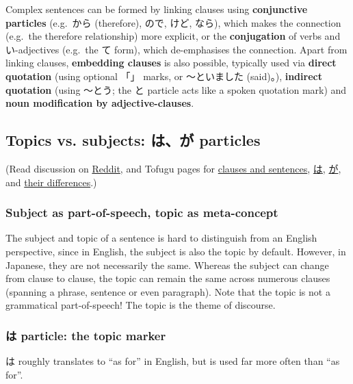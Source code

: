 \documentclass[../nihongo-gakushuu-kyouzai.tex]{subfiles}
\begin{document}
Complex sentences can be formed by linking clauses using \textbf{conjunctive particles} (e.g.\ から (therefore), ので, けど, なら), which makes the connection (e.g.\ the therefore relationship) more explicit, or the \textbf{conjugation} of verbs and い-adjectives (e.g.\ the て form), which de-emphasises the connection. Apart from linking clauses, \textbf{embedding clauses} is also possible, typically used via \textbf{direct quotation} (using optional 「」 marks, or 〜といました (said)。), \textbf{indirect quotation} (using 〜とう; the と particle acts like a spoken quotation mark) and \textbf{noun modification by adjective-clauses}.

\subsection{Topics vs. subjects: は、が particles} \label{sec:topics-and-subjects}
(Read discussion on \href{https://www.reddit.com/r/LearnJapanese/comments/jt49jj/please_stop_thinking_in_terms_of_\%E3\%81\%AF_vs_\%E3\%81\%8C/}{Reddit}, and Tofugu pages for \href{https://www.tofugu.com/japanese-grammar/sentences-and-clauses/}{clauses and sentences}, \href{https://www.tofugu.com/japanese-grammar/particle-wa/}{は}, \href{https://www.tofugu.com/japanese-grammar/particle-ga/}{が}, and \href{https://www.tofugu.com/japanese/wa-and-ga/}{their differences}.)

\subsubsection{Subject as part-of-speech, topic as meta-concept}
The subject and topic of a sentence is hard to distinguish from an English perspective, since in English, the subject is also the topic by default. However, in Japanese, they are not necessarily the same. Whereas the subject can change from clause to clause, the topic can remain the same across numerous clauses (spanning a phrase, sentence or even paragraph). Note that the topic is not a grammatical part-of-speech! The topic is the theme of discourse.

\subsubsection{は particle: the topic marker}
は roughly translates to ``as for'' in English, but is used far more often than ``as for''.
\end{document}
